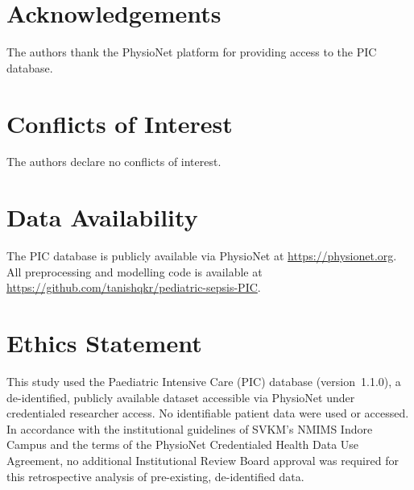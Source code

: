 \documentclass[final,3p,times]{elsarticle}
\begin{document}
\section*{Acknowledgements}
The authors thank the PhysioNet platform for providing access to
the PIC database.

\section*{Conflicts of Interest}
The authors declare no conflicts of interest.

\section*{Data Availability}
The PIC database is publicly available via PhysioNet at
\url{https://physionet.org}. All preprocessing and modelling code
is available at
\url{https://github.com/tanishqkr/pediatric-sepsis-PIC}.

\section*{Ethics Statement}
This study used the Paediatric Intensive Care (PIC) database
(version~1.1.0), a de-identified, publicly available dataset
accessible via PhysioNet under credentialed researcher access.
No identifiable patient data were used or accessed. In
accordance with the institutional guidelines of SVKM's NMIMS
Indore Campus and the terms of the PhysioNet Credentialed
Health Data Use Agreement, no additional Institutional Review
Board approval was required for this retrospective analysis of
pre-existing, de-identified data.



\end{document}
